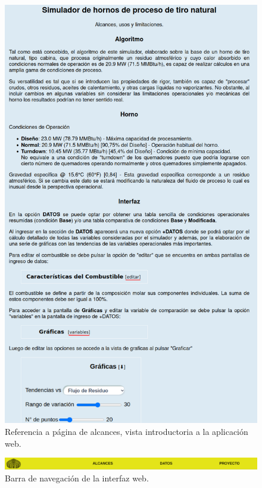 \begin{figure}[H] \begin{center}
\includegraphics[scale=0.33]{images/alcance}
\caption[Página de alcances]{Referencia a página de alcances, vista introductoria a la aplicación web.}
\label{fig:alcance}
\end{center} \end{figure}

\begin{figure}[H] \begin{center}
\includegraphics[scale=0.22]{images/navbar}
\caption[Barra de navegación]{Barra de navegación de la interfaz web.}
\label{fig:navbar}
\end{center} \end{figure}

